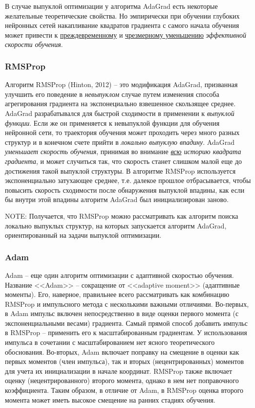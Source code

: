 \documentclass[%
	11pt,
	a4paper,
	utf8,
]{article}
\begin{document}
В случае выпуклой оптимизации у алгоритма AdaGrad есть некоторые желательные теоретические свойства. Но эмпирически при обучении глубоких нейронных сетей накапливание квадратов градиента с самого начала обучения может привести к \underline{преждевременному} и \underline{чрезмерному уменьшению} \emph{эффективной скорости обучения}.

\subsubsection{RMSProp}

Алгоритм RMSProp (Hinton, 2012) -- это модификация AdaGrad, призванная улучшить его поведение в \emph{невыпуклом} случае путем изменения способа агрегирования градиента на экспонециально взвешенное скользящее среднее. AdaGrad разрабатывался для быстрой сходимости в применении к \emph{выпуклой функции}. Если же он применяется к невыпуклой функции для обучения нейронной сети, то траектория обучения может проходить через много разных структур и в конечном счете прийти в \emph{локально выпуклую впадину}. AdaGrad \emph{уменьшает скорость обучения}, принимая во внимание \emph{\underline{всю} историю квадрата градиента}, и может случиться так, что скорость станет слишком малой еще до достижения такой выпуклой структуры. В алгоритме RMSProp используется экспоненциально затухающее среднее, т.е. далекое прошлое отбрасывается, чтобы повысить скорость сходимости после обнаружения выпуклой впадины, как если бы внутри этой впадины алгоритм AdaGrad был инициализирован заново.

NOTE: Получается, что RMSProp можно рассматривать как алгоритм поиска локально выпуклых структур, на которых запускается алгоритм AdaGrad, ориентированный на задачи выпуклой оптимизации.

\subsubsection{Adam}

Adam -- еще один алгоритм оптимизации с адаптивной скоростью обучения. Название <<Adam>> -- сокращение от <<adaptive moment>> (адаптивные моменты). Его, наверное, правильнее всего рассматривать как комбинацию RMSProp и импульсного метода с несколькими важными отличиями. Во-первых, в Adam импульс включен непосредственно в виде оценки первого момента (с экспоненциальными весами) градиента. Самый прямой способ добавить импульс в RMSProp -- применить его к масштабированным градиентам. У использования импульса в сочетании с масштабированием нет ясного теоретического обоснования. Во-вторых, Adam включает поправку на смещение в оценки как первых моментов (член импульса), так и вторых (нецентрированных) моментов для учета их инициализации в начале координат. RMSProp также включает оценку (нецентрированного) второго момента, однако в нем нет поправочного коэффициента. Таким образом, в отличие от Adam, в RMSProp оценка второго момента может иметь высокое смещение на ранних стадиях обучения.
\end{document}

